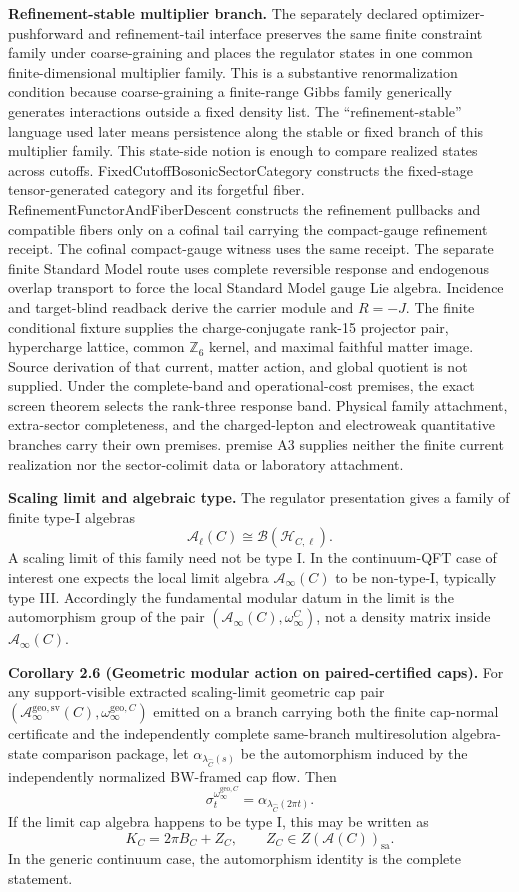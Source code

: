 \textbf{Refinement-stable multiplier branch.} The separately declared optimizer-pushforward and refinement-tail interface preserves the same finite constraint family under coarse-graining and places the regulator states in one common finite-dimensional multiplier family. This is a substantive renormalization condition because coarse-graining a finite-range Gibbs family generically generates interactions outside a fixed density list. The ``refinement-stable'' language used later means persistence along the stable or fixed branch of this multiplier family. This state-side notion is enough to compare realized states across cutoffs. FixedCutoffBosonicSectorCategory constructs the fixed-stage tensor-generated category and its forgetful fiber. RefinementFunctorAndFiberDescent constructs the refinement pullbacks and compatible fibers only on a cofinal tail carrying the compact-gauge refinement receipt. The cofinal compact-gauge witness uses the same receipt. The separate finite Standard Model route uses complete reversible response and endogenous overlap transport to force the local Standard Model gauge Lie algebra. Incidence and target-blind readback derive the carrier module and \(R=-J\). The finite conditional fixture supplies the charge-conjugate rank-15 projector pair, hypercharge lattice, common \(\mathbb Z_6\) kernel, and maximal faithful matter image. Source derivation of that current, matter action, and global quotient is not supplied. Under the complete-band and operational-cost premises, the exact screen theorem selects the rank-three response band. Physical family attachment, extra-sector completeness, and the charged-lepton and electroweak quantitative branches carry their own premises. premise A3 supplies neither the finite current realization nor the sector-colimit data or laboratory attachment.

\textbf{Scaling limit and algebraic type.} The regulator presentation gives a family of finite type-I algebras
\[
\mathcal A_{\ell}(C)\cong \mathcal B(\mathcal H_{C,\ell}).
\]
A scaling limit of this family need not be type I. In the continuum-QFT case of interest one expects the local limit algebra \(\mathcal A_\infty(C)\) to be non-type-I, typically type III. Accordingly the fundamental modular datum in the limit is the automorphism group of the pair \((\mathcal A_\infty(C),\omega_\infty^C)\), not a density matrix inside \(\mathcal A_\infty(C)\).

\textbf{Corollary 2.6 (Geometric modular action on paired-certified caps).} For any support-visible
extracted scaling-limit geometric cap pair
\((\mathcal A_\infty^{\mathrm{geo,sv}}(C),\omega_\infty^{\mathrm{geo},C})\) emitted on a branch
carrying both the finite cap-normal certificate and the independently complete same-branch
multiresolution algebra-state comparison package, let \(\alpha_{\lambda_{\widehat C}(s)}\) be the automorphism
induced by the independently normalized BW-framed cap flow. Then
\[
\sigma_t^{\omega_\infty^{\mathrm{geo},C}}
=
\alpha_{\lambda_{\widehat C}(2\pi t)}.
\]
If the limit cap algebra happens to be type I, this may be written as
\[
K_C=2\pi B_C+Z_C,\qquad Z_C\in Z(\mathcal A(C))_{\mathrm{sa}}.
\]
In the generic continuum case, the automorphism identity is the complete statement.

